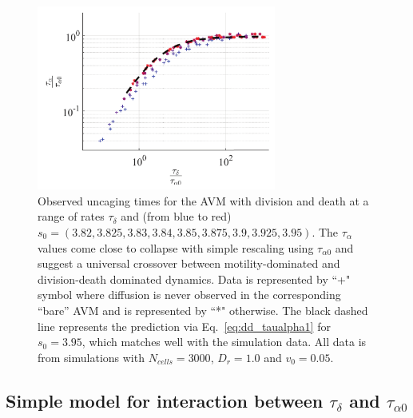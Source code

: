 \documentclass[
reprint
,aps
,amssymb
,amsmath
,superscriptaddress
]{revtex4-1}
\begin{document}

\begin{figure}[!t]  
\begin{center}
    \includegraphics[width=0.7\textwidth]{manuscript_images_timescale_collapse.pdf}
    \caption{\label{fig:dd_collapses} Observed uncaging times for the AVM with division and death at a range of rates $\tau_\delta$ and (from blue to red) $s_0 = (3.82, 3.825, 3.83, 3.84, 3.85, 3.875, 3.9, 3.925, 3.95)$. The $\tau_\alpha$ values come close to collapse with simple rescaling using $\tau_{\alpha0}$ and suggest a universal crossover between motility-dominated and division-death dominated dynamics. Data is represented by ``+" symbol where diffusion is never observed in the corresponding ``bare'' AVM and is represented by ``*" otherwise. The black dashed line represents the prediction via Eq.~\ref{eq:dd_taualpha1} for $s_0=3.95$, which matches well with the simulation data. All data is from simulations with $N_{cells} = 3000$, $D_r=1.0$ and $v_0 = 0.05$.  
    }
    \end{center}
\end{figure}

\subsection{Simple model for interaction between \texorpdfstring{$\tau_\delta$}{Td} and \texorpdfstring{$\tau_{\alpha0}$}{Ta0}}
\end{document}
